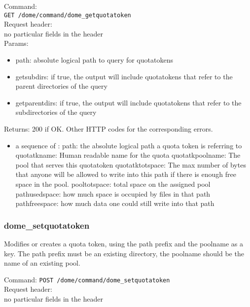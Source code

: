 \documentclass[a4paper,10pt]{scrreprt}
\begin{document}
Command:\\
\lstinline"GET /dome/command/dome_getquotatoken"\\

Request header:\\
 no particular fields in the header\\

Params:\\
\begin{itemize}
 \item path: absolute logical path to query for quotatokens
 \item getsubdirs: if true, the output will include quotatokens that refer to the parent directories of the query
 \item getparentdirs: if true, the output will include quotatokens that refer to the subdirectories of the query
\end{itemize}

Returns: 200 if OK. Other HTTP codes for the corresponding errors.\\
\begin{itemize}
 \item a sequence of :
 \subitem path: the absolute logical path a quota token is referring to
 \subitem quotatkname: Human readable name for the quota
 \subitem quotatkpoolname: The pool that serves this quotatoken
 \subitem quotatktotspace: The max number of bytes that anyone will
 be allowed to write into this path if there is enough free space in the pool.
 \subitem pooltotspace: total space on the assigned pool
 \subitem pathusedspace: how much space is occupied by files in that path
 \subitem pathfreespace: how much data one could still write into that path
\end{itemize}

\subsubsection{dome\_setquotatoken}
Modifies or creates a quota token, using the path prefix and the poolname as a key. The path prefix must be an existing directory, the poolname should be the name of an existing pool.

Command:
\lstinline"POST /dome/command/dome_setquotatoken"\\

Request header:\\
 no particular fields in the header\\
\end{document}
